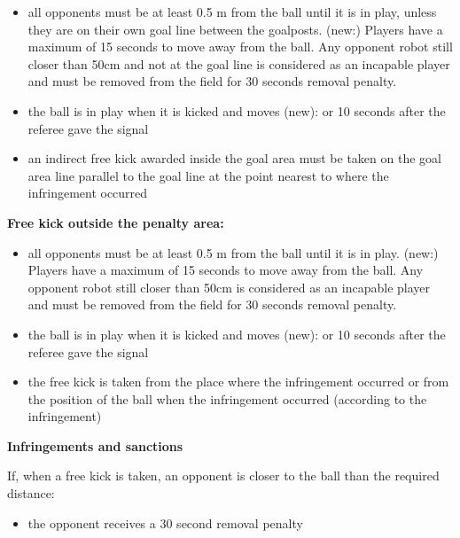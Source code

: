 \begin{itemize}
\item all opponents must be at least 0.5 m from the ball until it is in play, unless they are on their own goal line between the goalposts. (new:) Players have a maximum of 15 seconds to move away from the ball. Any opponent robot still closer than 50cm and not at the goal line is considered as an incapable player and must be removed from the field for 30 seconds removal penalty.
\item the ball is in play when it is kicked and moves (new): or 10 seconds after the referee gave the signal
\item an indirect free kick awarded inside the goal area must be taken on the goal area line parallel to the goal line at the point nearest to where the infringement occurred
\end{itemize}

\bigskip

\textbf{Free kick outside the penalty area:}

\begin{itemize}
\item all opponents must be at least 0.5 m from the ball until it is in play. (new:) Players have a maximum of 15 seconds to move away from the ball. Any opponent robot still closer than 50cm is considered as an incapable player and must be removed from the field for 30 seconds removal penalty.
\item the ball is in play when it is kicked and moves (new):  or 10 seconds after the referee gave the signal
\item the free kick is taken from the place where the infringement occurred or from the position of the ball when the infringement occurred (according to the infringement)
\end{itemize}

\bigskip

{\bfseries Infringements and sanctions}

\headlinebox

If, when a free kick is taken, an opponent is closer to the ball than the required distance:

\begin{itemize}
\item the opponent receives a 30 second removal penalty 
\end{itemize}

